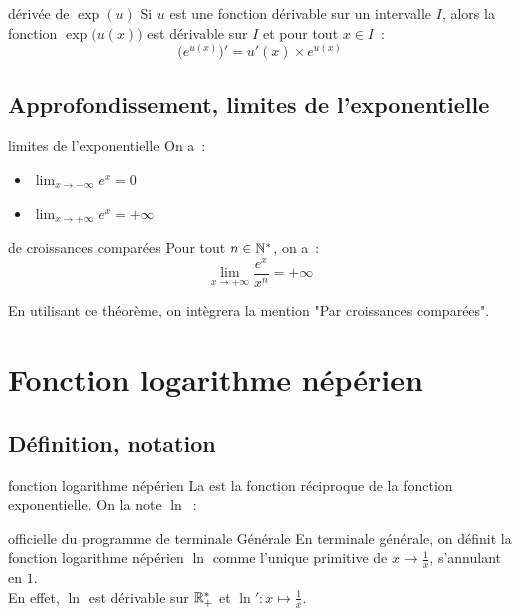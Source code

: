 \begin{proposition}{}{dérivée de $\exp(u)$}
    Si $u$ est une fonction dérivable sur un intervalle $I$, alors la fonction $\exp\Big(u(x)\Big)$ est dérivable sur $I$ et pour tout $x \in I$~:
    $$\big(e^{u(x)}\big)' = u'(x) \times e^{u(x)}$$
\end{proposition}

\subsection{Approfondissement, limites de l'exponentielle}

\begin{proposition}{}{limites de l'exponentielle}
    On a~:
    \begin{itemize}
        \item $\displaystyle \lim_{x \to -\infty} e^x = 0$
        \item $\displaystyle \lim_{x \to +\infty} e^x = +\infty$
    \end{itemize}

\end{proposition}

\begin{theoreme}{}{de croissances comparées}
    Pour tout $n \in \mathbb{N}^*$, on a~:
    $$\lim_{x \to +\infty} \frac{e^x}{x^n} = +\infty$$
\end{theoreme}

\begin{remarque}{}{}
    En utilisant ce théorème, on intègrera la mention "Par croissances comparées".
\end{remarque}  




\section{Fonction logarithme népérien}
\subsection{Définition, notation}
\begin{definition}{}{fonction logarithme népérien}
    La  est la fonction réciproque de la fonction exponentielle. On la note $\ln$~:
\end{definition}

\begin{definition}{}{officielle du programme de terminale Générale}
    En terminale générale, on définit la fonction logarithme népérien $\ln$ comme l'unique primitive de $x \to \frac{1}{x}$, s'annulant en $1$.\\
    En effet, $\ln$ est dérivable sur $\mathbb{R}_+^*$ et $\ln': x \mapsto \frac{1}{x}$.
\end{definition}

